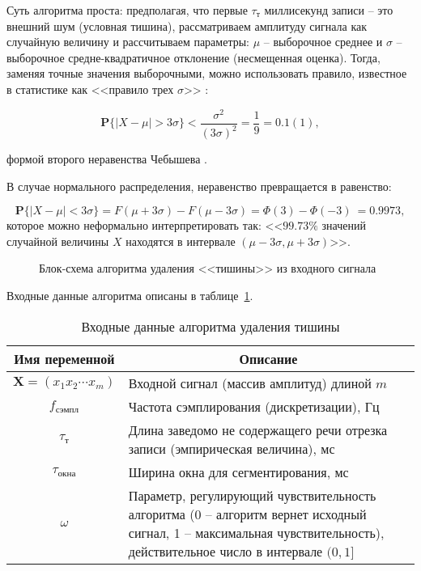 Суть алгоритма проста: предполагая, что первые $\tau_т$ миллисекунд записи -- это внешний шум (условная тишина), рассматриваем амплитуду сигнала как случайную величину и рассчитываем параметры: $\mu$ -- выборочное среднее и $\sigma$ -- выборочное средне-квадратичное отклонение (несмещенная оценка). Тогда, заменяя точные значения выборочными, можно использовать правило, известное в статистике как <<правило трех $\sigma$>> \cite{Pukelsheim1994threesigma}:

\begin{equation}
\textbf{P} \{|X - \mu| > 3\sigma\} < \frac{\sigma^2}{(3\sigma)^2} = \frac{1}{9} = 0.1(1),
\end{equation}

 формой второго неравенства Чебышева \cite{BMSTUM17}.

В случае нормального распределения, неравенство превращается в равенство:

\begin{equation}
\textbf{P} \{|X - \mu| < 3\sigma\} = F(\mu + 3\sigma) - F(\mu - 3\sigma) = \Phi(3) - \Phi(-3) ~= 0.9973,
\end{equation}
которое можно неформально интерпретировать так: <<$99.73\%$ значений случайной величины $X$ находятся в интервале $(\mu - 3\sigma, \mu + 3\sigma)$>>.

\begin{figure}[htp!]
    \caption{Блок-схема алгоритма удаления <<тишины>> из входного сигнала}
    \label{fig:silence_remove_flowchart}
\end{figure}

Входные данные алгоритма описаны в таблице~\ref{tab:unsilence_args}.

\begin{table}[h]
    \caption{Входные данные алгоритма удаления тишины}
    \begin{tabular}{|c|p{13cm}|}
    \hline
    \multicolumn{1}{|c|}{\textbf{Имя переменной}} &
    \multicolumn{1}{|c|}{\textbf{Описание}} \\
    \hline
    $\mathbf{X} = (x_1 x_2 \cdots x_m)$ & Входной сигнал (массив амплитуд) длиной $m$ \\
    $f_{сэмпл}$                         & Частота сэмплирования (дискретизации), Гц \\
    $\tau_{т}$                          & Длина заведомо не содержащего речи отрезка записи (эмпирическая величина), мс\\
    $\tau_{окна}$                       & Ширина окна для сегментирования, мс\\
    $\omega$                            & Параметр, регулирующий чувствительность алгоритма (0 -- алгоритм вернет исходный сигнал, 1 -- максимальная чувствительность), действительное число в интервале $(0, 1]$\\
    \hline
    \end{tabular}
    \label{tab:unsilence_args}
\end{table}

